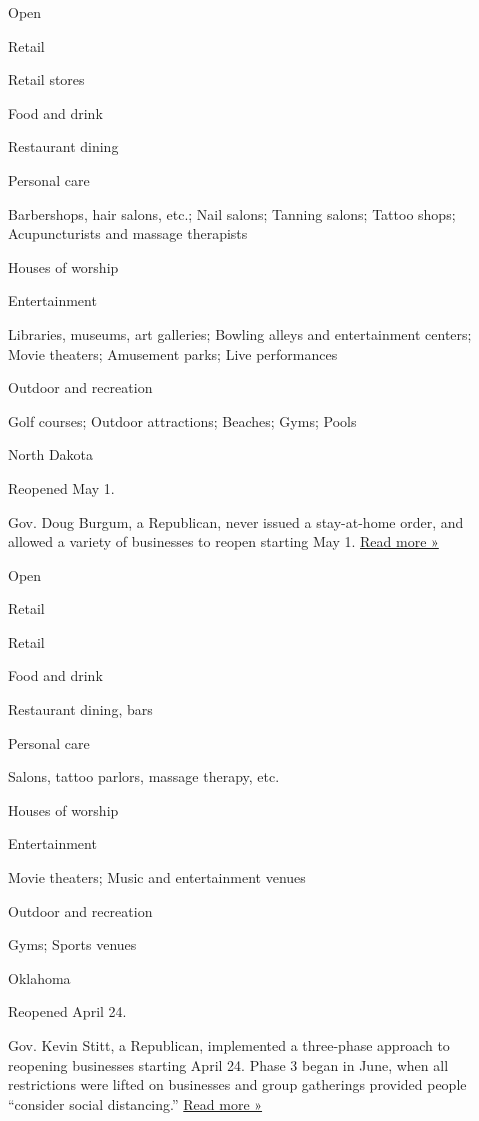 Open

Retail

Retail stores

Food and drink

Restaurant dining

Personal care

Barbershops, hair salons, etc.; Nail salons; Tanning salons; Tattoo
shops; Acupuncturists and massage therapists

Houses of worship

Entertainment

Libraries, museums, art galleries; Bowling alleys and entertainment
centers; Movie theaters; Amusement parks; Live performances

Outdoor and recreation

Golf courses; Outdoor attractions; Beaches; Gyms; Pools

North Dakota

Reopened May 1.

Gov. Doug Burgum, a Republican, never issued a stay-at-home order, and
allowed a variety of businesses to reopen starting May 1.
\href{https://bismarcktribune.com/news/local/health/task-force-created-as-burleigh-morton-blooms-into-coronavirus-hot-spot/article_65d08b69-223c-5d79-bafe-05352f3d12bd.html}{Read
more »}

Open

Retail

Retail

Food and drink

Restaurant dining, bars

Personal care

Salons, tattoo parlors, massage therapy, etc.

Houses of worship

Entertainment

Movie theaters; Music and entertainment venues

Outdoor and recreation

Gyms; Sports venues

Oklahoma

Reopened April 24.

Gov. Kevin Stitt, a Republican, implemented a three-phase approach to
reopening businesses starting April 24. Phase 3 began in June, when all
restrictions were lifted on businesses and group gatherings provided
people ``consider social distancing.''
\href{https://www.tulsaworld.com/news/oklahoma-to-begin-phase-3-of-reopening-monday-after-covid-19-data-shows-promising-downward/article_542617ce-c9e8-5825-bfdd-db6796999793.html\#18}{Read
more »}

